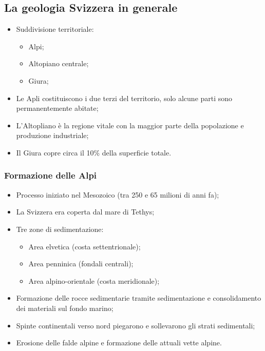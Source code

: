 \documentclass{article}
\begin{document}
\subsection{La geologia Svizzera in generale}
\begin{itemize}
    \item Suddivisione territoriale:
        \begin{itemize}
            \item Alpi;
            \item Altopiano centrale;
            \item Giura;
        \end{itemize}
    \item Le Apli costituiscono i due terzi del territorio, solo alcune parti sono
        permanentemente abitate;
    \item L'Altopliano è la regione vitale con la maggior parte della popolazione e produzione
        industriale;
    \item Il Giura copre circa il 10\% della superficie totale.
\end{itemize}

\subsubsection{Formazione delle Alpi}
\begin{itemize}
    \item Processo iniziato nel Mesozoico (tra 250 e 65 milioni di anni fa);
    \item La Svizzera era coperta dal mare di Tethys;
    \item Tre zone di sedimentazione:
        \begin{itemize}
            \item Area elvetica (costa settentrionale);
            \item Area penninica (fondali centrali);
            \item Area alpino-orientale (costa meridionale);
        \end{itemize}
    \item Formazione delle rocce sedimentarie tramite sedimentazione e consolidamento dei
        materiali sul fondo marino;
    \item Spinte continentali verso nord piegarono e sollevarono gli strati sedimentali;
    \item Erosione delle falde alpine e formazione delle attuali vette alpine.
\end{itemize}
\end{document}
